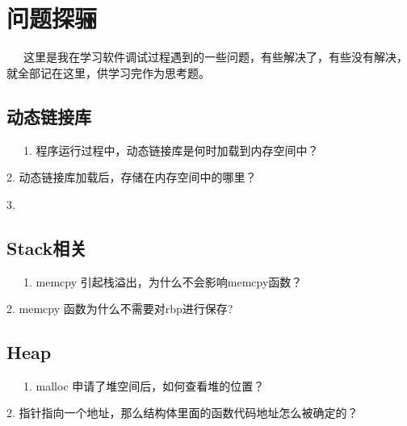 \documentclass[12pt]{article}  %
\begin{document}
\section{问题探骊} %
\ \ \ 这里是我在学习软件调试过程遇到的一些问题，有些解决了，有些没有解决，就全部记在这里，供学习完作为思考题。
\label{sec:Latex无极限}
\subsection{动态链接库}
\ \ \ 1. 程序运行过程中，动态链接库是何时加载到内存空间中？\par
2. 动态链接库加载后，存储在内存空间中的哪里？\par
3.  
\subsection{Stack相关}
\ \ \ 1. memcpy 引起栈溢出，为什么不会影响memcpy函数？\par
2. memcpy 函数为什么不需要对rbp进行保存?\par
\subsection{Heap}
\ \ \ 1. malloc 申请了堆空间后，如何查看堆的位置？\par
2. 指针指向一个地址，那么结构体里面的函数代码地址怎么被确定的？
\end{document}
